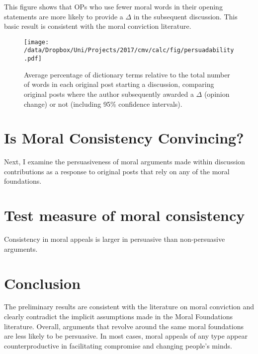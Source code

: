 This figure shows that OPs who use fewer moral words in their opening statements are more likely to provide a \(\Delta\) in the subsequent discussion. This basic result is consistent with the moral conviction literature.

\begin{figure}
\centering
\texttt{[image: /data/Dropbox/Uni/Projects/2017/cmv/calc/fig/persuadability.pdf]}
\caption{Average percentage of dictionary terms relative to the total number of words in each original post starting a discussion, comparing original posts where the author subsequently awarded a $\Delta$ (opinion change) or not (including 95\% confidence intervals).}
\end{figure}

\section{Is Moral Consistency
Convincing?}\label{is-moral-consistency-convincing}

Next, I examine the persuasiveness of moral arguments made within discussion contributions as a response to original posts that rely on any of the moral foundations.


\section{Test measure of moral consistency}\label{test-measure-of-moral-consistency}


Consistency in moral appeals is larger in persuasive than non-persuasive arguments.

\section{Conclusion}\label{conclusion}

The preliminary results are consistent with the literature on moral conviction and clearly contradict the implicit assumptions made in the Moral Foundations literature. Overall, arguments that revolve around the same moral foundations are less likely to be persuasive. In most cases, moral appeals of any type appear counterproductive in facilitating compromise and changing people's minds.


